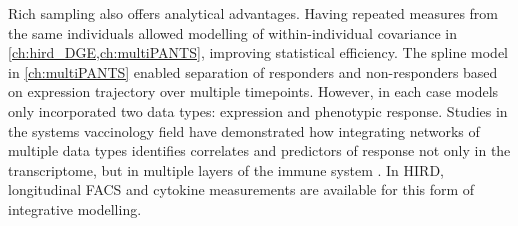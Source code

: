Rich sampling also offers analytical advantages.
Having repeated measures from the same individuals allowed modelling of within-individual covariance in \cref{ch:hird_DGE,ch:multiPANTS}, improving statistical efficiency.
The spline model in \cref{ch:multiPANTS} enabled separation of responders and non-responders based on expression trajectory over multiple timepoints.
However, in each case models only incorporated two data types: expression and phenotypic response.
Studies in the systems vaccinology field have demonstrated how integrating networks of multiple data types identifies correlates and predictors of response not only in the transcriptome, 
but in multiple layers of the immune system \autocite{li2017MetabolicPhenotypesResponse}.
In \gls{HIRD}, longitudinal \gls{FACS} and cytokine measurements are available for this form of integrative modelling.


